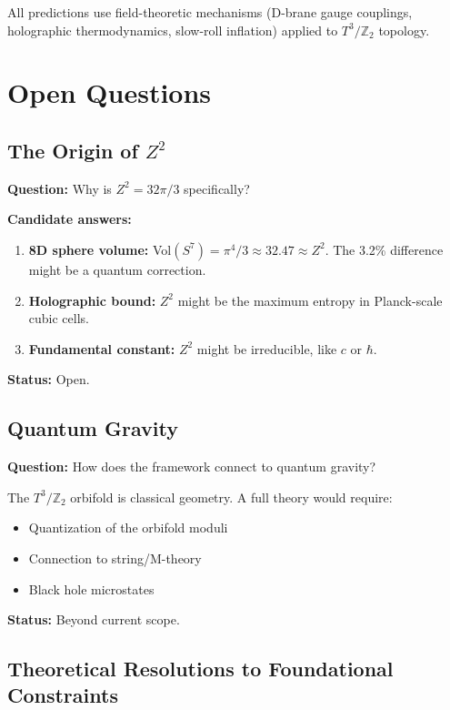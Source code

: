 \documentclass[12pt,a4paper]{article}
\newcommand{\Ztwo}{\mathbb{Z}_2}
\newcommand{\Tthree}{T^3}
\newcommand{\Zsq}{Z^2}
\begin{document}
All predictions use field-theoretic mechanisms (D-brane gauge couplings, holographic thermodynamics, slow-roll inflation) applied to $\Tthree/\Ztwo$ topology.

\section{Open Questions}
\label{sec:open}

\subsection{The Origin of $\Zsq$}

\textbf{Question:} Why is $\Zsq = 32\pi/3$ specifically?

\textbf{Candidate answers:}
\begin{enumerate}
    \item \textbf{8D sphere volume:} Vol$(S^7) = \pi^4/3 \approx 32.47 \approx \Zsq$. The 3.2\% difference might be a quantum correction.
    \item \textbf{Holographic bound:} $\Zsq$ might be the maximum entropy in Planck-scale cubic cells.
    \item \textbf{Fundamental constant:} $\Zsq$ might be irreducible, like $c$ or $\hbar$.
\end{enumerate}

\textbf{Status:} Open.

\subsection{Quantum Gravity}

\textbf{Question:} How does the framework connect to quantum gravity?

The $\Tthree/\Ztwo$ orbifold is classical geometry. A full theory would require:
\begin{itemize}
    \item Quantization of the orbifold moduli
    \item Connection to string/M-theory
    \item Black hole microstates
\end{itemize}

\textbf{Status:} Beyond current scope.

\subsection{Theoretical Resolutions to Foundational Constraints}
\end{document}
